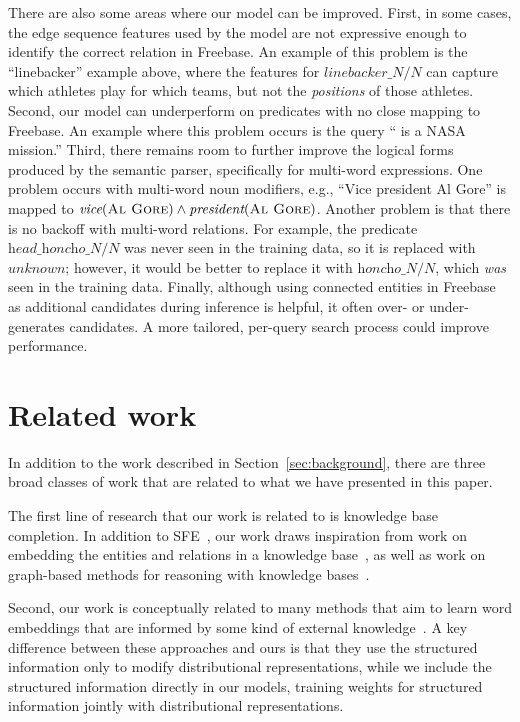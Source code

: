 \documentclass[11pt]{article}
\newcommand{\secref}[1]{Section~\ref{sec:#1}}
\newcommand{\blank}{\underline{\hspace{.5cm}}}
\newcommand{\lexicalpredicate}[1]{\ensuremath{\textit{#1}}}
\newcommand{\entity}[1]{\ensuremath{\textsc{#1}}}
\begin{document}
There are also some areas where our model can be improved. First, in
some cases, the edge sequence features used by the model are not
expressive enough to identify the correct relation in Freebase. An
example of this problem is the ``linebacker'' example above, where the
features for \lexicalpredicate{linebacker\_N/N} can capture which athletes
play for which teams, but not the \emph{positions} of those
athletes. Second, our model can underperform on predicates with no
close mapping to Freebase. An example where this problem occurs is the
query ``\blank{} is a NASA mission.'' Third, there remains room to
further improve the logical forms produced by the semantic parser,
specifically for multi-word expressions. One problem occurs with
multi-word noun modifiers, e.g., ``Vice president Al Gore'' is mapped
to $\lexicalpredicate{vice}(\entity{Al Gore}) \land
\lexicalpredicate{president}(\entity{Al Gore})$. Another problem is that
there is no backoff with multi-word relations. For example, the
predicate \lexicalpredicate{head\_honcho\_N/N} was never seen in the training
data, so it is replaced with \lexicalpredicate{unknown}; however, it would be
better to replace it with \lexicalpredicate{honcho\_N/N}, which \emph{was}
seen in the training data. Finally, although using connected entities
in Freebase as additional candidates during inference is helpful, it
often over- or under-generates candidates. A more tailored, per-query
search process could improve performance.

\section{Related work}

In addition to the work described in \secref{background}, there are
three broad classes of work that are related to what we have presented
in this paper.

The first line of research that our work is related to is knowledge
base completion.  In addition to SFE~\cite{gardner-2015-sfe}, our work
draws inspiration from work on embedding the entities and relations in
a knowledge base~\cite{riedel-2013-mf-universal-schema,%
nickel-2011-rescal,bordes-2013-transe,nickel-2014-are,%
toutanova-2015-joint-text-kb-embedding}, as well as work on
graph-based methods for reasoning with knowledge
bases~\cite{lao-2010-original-pra,gardner-2014-vector-space-pra,%
neelakantan-2015-rnn-kbc}.

Second, our work is conceptually related to many methods that aim to
learn word embeddings that are informed by some kind of external
knowledge~\cite{faruqui-2015-retrofitting-word-vectors,%
rocktaschel-2015-logical-embeddings,schwartz-2016-symmetric-patterns-w2v,%
yu-2014-w2v-with-semantic-knowledge}.
A key difference between these approaches and ours is that they use
the structured information only to modify distributional
representations, while we include the structured information directly
in our models, training weights for structured information jointly
with distributional representations.
\end{document}
